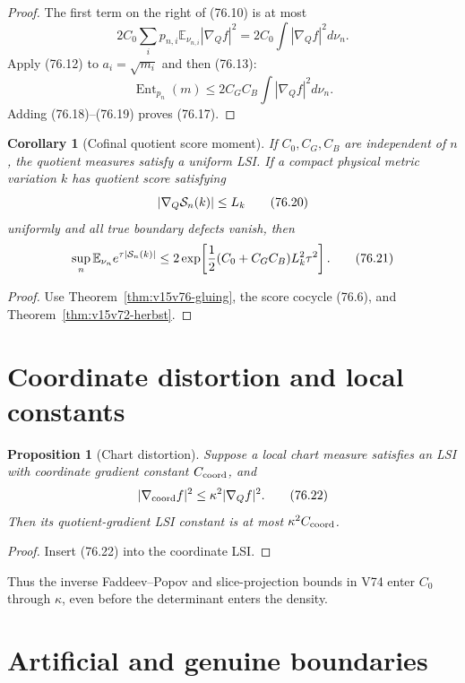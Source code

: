 \documentclass[11pt]{article}
\newtheorem{proposition}[theorem]{Proposition}
\newtheorem{corollary}[theorem]{Corollary}
\theoremstyle{remark}
\begin{document}
\begin{proof}
The first term on the right of (76.10) is at most
\[
 2C_0\sum_i p_{n,i}
 \mathbb E_{\nu_{n,i}}|\nabla_Qf|^2
 =
 2C_0\int|\nabla_Qf|^2d\nu_n.                         \tag{76.18}
\]
Apply (76.12) to \(a_i=\sqrt{m_i}\) and then (76.13):
\[
 \operatorname{Ent}_{p_n}(m)
 \leq
 2C_GC_B\int|\nabla_Qf|^2d\nu_n.                     \tag{76.19}
\]
Adding (76.18)--(76.19) proves (76.17).
\end{proof}

\begin{corollary}[Cofinal quotient score moment]
\label{cor:v15v76-cofinal}
If \(C_0,C_G,C_B\) are independent of \(n\), the quotient measures
satisfy a uniform LSI.  If a compact physical metric variation
\(k\) has quotient score satisfying
\[
 |\nabla_Q{\cal S}_{n}(k)|\leq L_k                    \tag{76.20}
\]
uniformly and all true boundary defects vanish, then
\[
 \sup_n\mathbb E_{\nu_n}e^{\tau|{\cal S}_n(k)|}
 \leq
 2\exp\!\left[
 \frac12(C_0+C_GC_B)L_k^2\tau^2
 \right].                                             \tag{76.21}
\]
\end{corollary}

\begin{proof}
Use Theorem~\ref{thm:v15v76-gluing}, the score cocycle
(76.6), and Theorem~\ref{thm:v15v72-herbst}.
\end{proof}

\section{Coordinate distortion and local constants}

\begin{proposition}[Chart distortion]
\label{prop:v15v76-distortion}
Suppose a local chart measure satisfies an LSI with coordinate
gradient constant \(C_{\rm coord}\), and
\[
 |\nabla_{\rm coord}f|^2
 \leq\kappa^2|\nabla_Qf|^2.                           \tag{76.22}
\]
Then its quotient-gradient LSI constant is at most
\(\kappa^2C_{\rm coord}\).
\end{proposition}

\begin{proof}
Insert (76.22) into the coordinate LSI.
\end{proof}

Thus the inverse Faddeev--Popov and slice-projection bounds in V74
enter \(C_0\) through \(\kappa\), even before the determinant enters
the density.

\section{Artificial and genuine boundaries}
\end{document}
